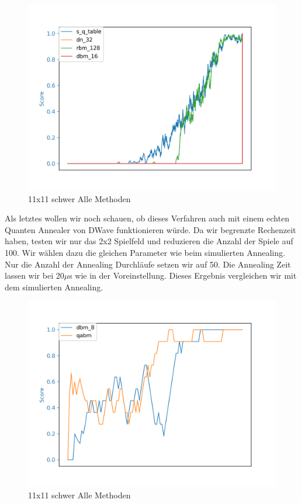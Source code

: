 \begin{figure}[H]
\centering
\includegraphics[width=\textwidth]{Figures/all_8x8_s_q_table_dn_32_rbm_128_dbm_16.png}
\caption{11x11 schwer Alle Methoden}
\label{all_14}
\end{figure}

Als letztes wollen wir noch schauen, ob dieses Verfahren auch mit einem echten Quanten Annealer von DWave funktionieren würde. Da wir begrenzte Rechenzeit haben, testen wir nur das 2x2 Spielfeld und reduzieren die Anzahl der Spiele auf 100. Wir wählen dazu die gleichen Parameter wie beim simulierten Annealing. Nur die Anzahl der Annealing Durchläufe setzen wir auf 50. Die Annealing Zeit lassen wir bei 20$\mu$s wie in der Voreinstellung. Dieses Ergebnis vergleichen wir mit dem simulierten Annealing.

\begin{figure}[H]
\centering
\includegraphics[width=\textwidth]{Figures/qabm_c2x2_dbm_8_qabm.png}
\caption{11x11 schwer Alle Methoden}
\label{all_14}
\end{figure}

